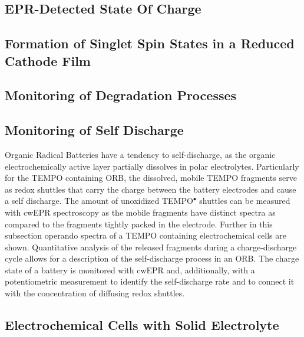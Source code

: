 \subsection{EPR-Detected State Of Charge}

\subsection{Formation of Singlet Spin States in a Reduced Cathode Film}

\subsection{Monitoring of Degradation Processes}

\subsection{Monitoring of Self Discharge}
Organic Radical Batteries have a tendency to self-discharge, as the organic electrochemically active layer partially dissolves in polar electrolytes. Particularly for the TEMPO containing ORB, the dissolved, mobile TEMPO fragments serve as redox shuttles that carry the charge between the battery electrodes and cause a self discharge. The amount of unoxidized TEMPO$^\bullet$ shuttles can be measured with cwEPR spectroscopy as the mobile fragments have distinct spectra as compared to the fragments tightly packed in the electrode. Further in this subsection operando spectra of a TEMPO containing electrochemical cells are shown. Quantitative analysis of the released fragments during a charge-discharge cycle allows for a description of the self-discharge process in an ORB. The charge state of a battery is monitored with cwEPR and, additionally, with a potentiometric measurement to identify the self-discharge rate and to connect it with the concentration of diffusing redox shuttles.

\subsection{Electrochemical Cells with Solid Electrolyte}





